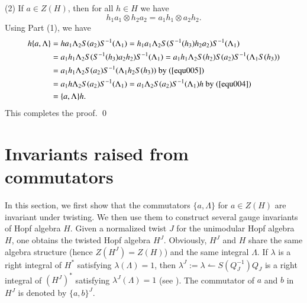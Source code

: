 \documentclass[11pt]{amsart}
\numberwithin{equation}{section}
\begin{document}
(2) If $a\in Z(H)$, then for all $h\in H$ we have $$h_{1}a_{1}\otimes h_{2}a_{2}=a_{1}h_{1}\otimes a_{2}h_{2}.$$
 Using Part (1), we have
\begin{align*}
h\{a,\Lambda\}
&=ha_{1}\Lambda_{2}S(a_{2})S^{-1}(\Lambda_{1})
=h_1a_{1}\Lambda_{2}S(S^{-1}(h_3)h_2a_{2})S^{-1}(\Lambda_{1})\\
&=a_1h_1\Lambda_{2}S(S^{-1}(h_3)a_2h_2)S^{-1}(\Lambda_{1})
=a_1h_1\Lambda_{2}S(h_2)S(a_2)S^{-1}(\Lambda_{1}S(h_3))\\
&=a_1h_1\Lambda_{2}S(a_2)S^{-1}(\Lambda_{1}h_2S(h_3))\ \text{by}\ (\ref{equ005})\\
&=a_1h\Lambda_{2}S(a_2)S^{-1}(\Lambda_{1})
=a_1\Lambda_{2}S(a_2)S^{-1}(\Lambda_{1})h\ \text{by}\ (\ref{equ004})\\
&=\{a,\Lambda\}h.
\end{align*}
This completes the proof.
\qed


\section{\bf Invariants raised from commutators}
In this section, we first show that the commutators $\{a,\Lambda\}$ for $a\in Z(H)$ are invariant under twisting. We then use them to construct several gauge invariants of Hopf algebra $H$.
Given a normalized twist $J$ for the unimodular Hopf algebra $H$, one obtains the twisted Hopf algebra $H^J$. Obviously, $H^J$ and $H$ share the same algebra structure (hence $Z(H^J)=Z(H)$) and the same integral $\Lambda$. If $\lambda$ is a  right integral of $H^*$ satisfying $\lambda(\Lambda)=1$, then $\lambda^J:=\lambda\leftharpoonup S(Q_J^{-1})Q_J$ is a right integral of $(H^J)^*$ satisfying $\lambda^J(\Lambda)=1$ (see \cite[Theorem 3.4]{AEGN}).
The commutator of $a$ and $b$ in $H^J$ is denoted by $\{a,b\}^J$. 
\end{document}
